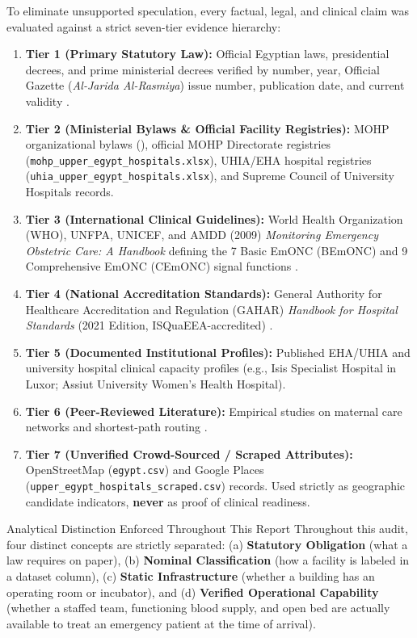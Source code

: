 \documentclass[10pt,a4paper]{article}
\begin{document}
To eliminate unsupported speculation, every factual, legal, and clinical claim was evaluated against a strict seven-tier evidence hierarchy:
\begin{enumerate}
    \item \textbf{Tier 1 (Primary Statutory Law):} Official Egyptian laws, presidential decrees, and prime ministerial decrees verified by number, year, Official Gazette (\textit{Al-Jarida Al-Rasmiya}) issue number, publication date, and current validity \cite{egypt_law_51_1981_153_2004,egypt_pm_decree_1063_2014,egypt_law_2_2018_uhia,egypt_law_19_2018_univ,egypt_law_8_2021_blood,egypt_pres_decree_139_2009_eaa}.
    \item \textbf{Tier 2 (Ministerial Bylaws \& Official Facility Registries):} MOHP organizational bylaws (\cite{egypt_mohp_decree_75_2024}), official MOHP Directorate registries (\texttt{mohp\_upper\_egypt\_hospitals.xlsx}), UHIA/EHA hospital registries (\texttt{uhia\_upper\_egypt\_hospitals.xlsx}), and Supreme Council of University Hospitals records.
    \item \textbf{Tier 3 (International Clinical Guidelines):} World Health Organization (WHO), UNFPA, UNICEF, and AMDD (2009) \textit{Monitoring Emergency Obstetric Care: A Handbook} defining the 7 Basic EmONC (BEmONC) and 9 Comprehensive EmONC (CEmONC) signal functions \cite{who2009emonc}.
    \item \textbf{Tier 4 (National Accreditation Standards):} General Authority for Healthcare Accreditation and Regulation (GAHAR) \textit{Handbook for Hospital Standards} (2021 Edition, ISQuaEEA-accredited) \cite{gahar2021hospital}.
    \item \textbf{Tier 5 (Documented Institutional Profiles):} Published EHA/UHIA and university hospital clinical capacity profiles (e.g., Isis Specialist Hospital in Luxor; Assiut University Women's Health Hospital).
    \item \textbf{Tier 6 (Peer-Reviewed Literature):} Empirical studies on maternal care networks and shortest-path routing \cite{boeing2017osmnx}.
    \item \textbf{Tier 7 (Unverified Crowd-Sourced / Scraped Attributes):} OpenStreetMap (\texttt{egypt.csv}) and Google Places (\texttt{upper\_egypt\_hospitals\_scraped.csv}) records. Used strictly as geographic candidate indicators, \textbf{never} as proof of clinical readiness.
\end{enumerate}

\begin{methodbox}{Analytical Distinction Enforced Throughout This Report}
Throughout this audit, four distinct concepts are strictly separated: (a) \textbf{Statutory Obligation} (what a law requires on paper), (b) \textbf{Nominal Classification} (how a facility is labeled in a dataset column), (c) \textbf{Static Infrastructure} (whether a building has an operating room or incubator), and (d) \textbf{Verified Operational Capability} (whether a staffed team, functioning blood supply, and open bed are actually available to treat an emergency patient at the time of arrival).
\end{methodbox}
\end{document}
